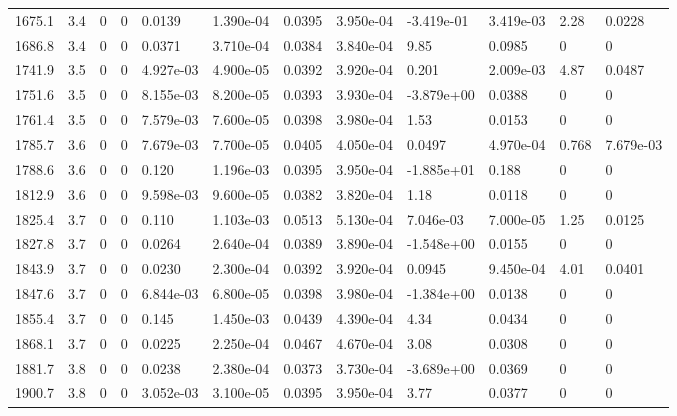 \documentclass[preview]{standalone}
\begin{document}
{{{{{\begin{tabular}{L{1.2cm}C{1.2cm} C{0.3cm}C{0.5cm} C{1.4cm}C{1.4cm} C{1.4cm}C{1.4cm} C{1.6cm}C{1.6cm} C{1.6cm}C{1.6cm}}
  1675.1  &   3.4  & 0     &  0 &  0.0139  & 1.390e-04  &  0.0395&   3.950e-04& -3.419e-01 & 3.419e-03   &  2.28 & 0.0228  \\ 
  1686.8  &   3.4  & 0     &  0 &  0.0371  & 3.710e-04  &  0.0384&   3.840e-04& 9.85 & 0.0985   &  0 & 0  \\ 
  1741.9  &   3.5  & 0     &  0 &  4.927e-03  & 4.900e-05  &  0.0392&   3.920e-04& 0.201 & 2.009e-03   &  4.87 & 0.0487  \\ 
  1751.6  &   3.5  & 0     &  0 &  8.155e-03  & 8.200e-05  &  0.0393&   3.930e-04& -3.879e+00 & 0.0388   &  0 & 0  \\ 
  1761.4  &   3.5  & 0     &  0 &  7.579e-03  & 7.600e-05  &  0.0398&   3.980e-04& 1.53 & 0.0153   &  0 & 0  \\ 
  1785.7  &   3.6  & 0     &  0 &  7.679e-03  & 7.700e-05  &  0.0405&   4.050e-04& 0.0497 & 4.970e-04   &  0.768 & 7.679e-03  \\ 
  1788.6  &   3.6  & 0     &  0 &  0.120  & 1.196e-03  &  0.0395&   3.950e-04& -1.885e+01 & 0.188   &  0 & 0  \\ 
  1812.9  &   3.6  & 0     &  0 &  9.598e-03  & 9.600e-05  &  0.0382&   3.820e-04& 1.18 & 0.0118   &  0 & 0  \\ 
  1825.4  &   3.7  & 0     &  0 &  0.110  & 1.103e-03  &  0.0513&   5.130e-04& 7.046e-03 & 7.000e-05   &  1.25 & 0.0125  \\ 
  1827.8  &   3.7  & 0     &  0 &  0.0264  & 2.640e-04  &  0.0389&   3.890e-04& -1.548e+00 & 0.0155   &  0 & 0  \\ 
  1843.9  &   3.7  & 0     &  0 &  0.0230  & 2.300e-04  &  0.0392&   3.920e-04& 0.0945 & 9.450e-04   &  4.01 & 0.0401  \\ 
  1847.6  &   3.7  & 0     &  0 &  6.844e-03  & 6.800e-05  &  0.0398&   3.980e-04& -1.384e+00 & 0.0138   &  0 & 0  \\ 
  1855.4  &   3.7  & 0     &  0 &  0.145  & 1.450e-03  &  0.0439&   4.390e-04& 4.34 & 0.0434   &  0 & 0  \\ 
  1868.1  &   3.7  & 0     &  0 &  0.0225  & 2.250e-04  &  0.0467&   4.670e-04& 3.08 & 0.0308   &  0 & 0  \\ 
  1881.7  &   3.8  & 0     &  0 &  0.0238  & 2.380e-04  &  0.0373&   3.730e-04& -3.689e+00 & 0.0369   &  0 & 0  \\ 
  1900.7  &   3.8  & 0     &  0 &  3.052e-03  & 3.100e-05  &  0.0395&   3.950e-04& 3.77 & 0.0377   &  0 & 0  \\ 
\hline 
\end{tabular} 

}}}}}
\end{document}
